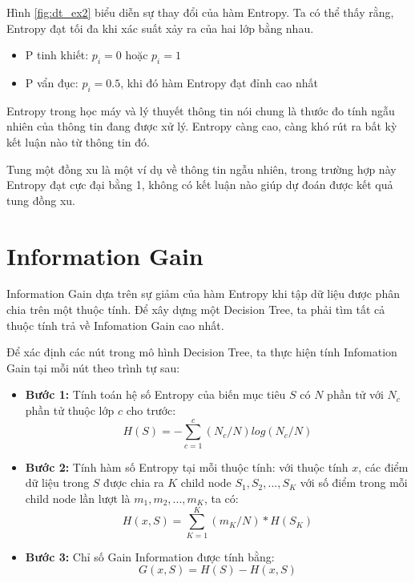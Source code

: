 Hình \ref{fig:dt_ex2} biểu diễn sự thay đổi của hàm Entropy.
Ta có thể thấy rằng, Entropy đạt tối đa khi xác suất xảy ra của hai lớp bằng nhau.

\begin{itemize}
    \item P tinh khiết: $p_i=0$ hoặc $p_i=1$
    \item P vẩn đục: $p_i=0.5$, khi đó hàm Entropy đạt đỉnh cao nhất
\end{itemize}

Entropy trong học máy và lý thuyết thông tin nói chung là thước đo tính ngẫu nhiên
của thông tin đang được xử lý. Entropy càng cao, càng khó rút ra bất kỳ kết luận nào
từ thông tin đó.

Tung một đồng xu là một ví dụ về thông tin ngẫu nhiên,
trong trường hợp này Entropy đạt cực đại bằng 1,
không có kết luận nào giúp dự đoán được kết quả tung đồng xu.

\section{Information Gain}
Information Gain dựa trên sự giảm của hàm Entropy khi tập dữ liệu được phân chia
trên một thuộc tính. Để xây dựng một Decision Tree, ta phải tìm tất cả thuộc tính
trả về Infomation Gain cao nhất.

Để xác định các nút trong mô hình Decision Tree, ta thực hiện tính
Infomation Gain tại mỗi nút theo trình tự sau:

\begin{itemize}
    \item \textbf{Bước 1:} Tính toán hệ số Entropy của biến mục tiêu $S$ có $N$ phần tử
    với $N_c$ phần tử thuộc lớp $c$ cho trước:
    \begin{equation*}
        H(S) = -\sum_{c=1}^{c}(N_c/N)log(N_c/N)
    \end{equation*}

    \item \textbf{Bước 2:} Tính hàm số Entropy tại mỗi thuộc tính:
    với thuộc tính $x$, các điểm dữ liệu trong $S$ được chia ra $K$
    child node $S_1, S_2,..., S_K$ với số điểm trong mỗi child node
    lần lượt là $m_1, m_2,..., m_K$, ta có:
    \begin{equation*}
        H(x, S) = \sum_{K=1}^{K}(m_K/N)*H(S_K)
    \end{equation*}

    \item \textbf{Bước 3:} Chỉ số Gain Information được tính bằng:
    \begin{equation*}
        G(x, S) = H(S) - H(x, S)
    \end{equation*}
\end{itemize}

